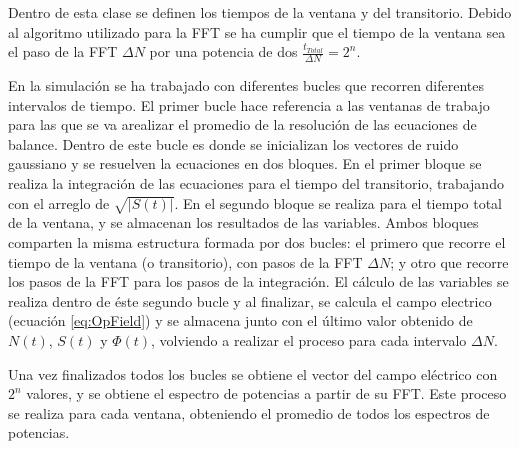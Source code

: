 		Dentro de esta clase se definen los tiempos de la ventana y del transitorio. Debido al algoritmo utilizado para la FFT se ha cumplir que el tiempo de la ventana sea el paso de la FFT $\Delta N$ por una potencia de dos $\frac{t_{Total}}{\Delta N} = 2^n$.

		En la simulaci\'on se ha trabajado con diferentes bucles que recorren diferentes intervalos de tiempo. El primer bucle hace referencia a las ventanas de trabajo para las que se va arealizar el promedio de la resoluci\'on de las ecuaciones de balance. Dentro de este bucle es donde se inicializan los vectores de ruido gaussiano y se resuelven la ecuaciones en dos bloques. En el primer bloque se realiza la integraci\'on de las ecuaciones para el tiempo del transitorio, trabajando con el arreglo de $\sqrt{|S(t)|}$. En el segundo bloque se realiza para el tiempo total de la ventana, y se almacenan los resultados de las variables. Ambos bloques comparten la misma estructura formada por dos bucles: el primero que recorre el tiempo de la ventana (o transitorio), con pasos de la FFT $\Delta N$; y otro que recorre los pasos de la FFT para los pasos de la integraci\'on. El c\'alculo de las variables se realiza dentro de \'este segundo bucle y al finalizar, se calcula el campo electrico (ecuaci\'on \ref{eq:OpField}) y se almacena junto con el \'ultimo valor obtenido de $N(t)$, $S(t)$ y $\Phi(t)$, volviendo a realizar el proceso para cada intervalo $\Delta N$. 

		Una vez finalizados todos los bucles se obtiene el vector del campo el\'ectrico con $2^n$ valores, y se obtiene el espectro de potencias a partir de su FFT. Este proceso se realiza para cada ventana, obteniendo el promedio de todos los espectros de potencias.
